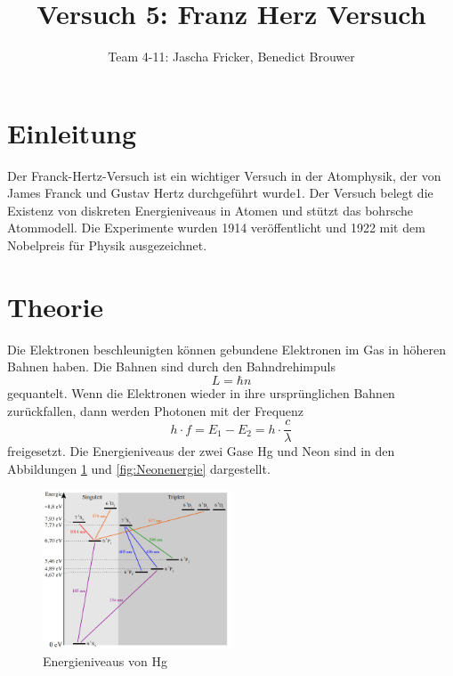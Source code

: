 \documentclass[11pt, a4paper]{article}
\title{Versuch 5: Franz Herz Versuch}
\author{Team 4-11: Jascha Fricker, Benedict Brouwer}
\begin{document}
    \maketitle

    \tableofcontents

    \newpage

    \section{Einleitung}
    Der Franck-Hertz-Versuch ist ein wichtiger Versuch in der Atomphysik, der von James Franck und Gustav Hertz durchgeführt wurde1. Der Versuch belegt die Existenz von diskreten Energieniveaus in Atomen und stützt das bohrsche Atommodell. Die Experimente wurden 1914 veröffentlicht und 1922 mit dem Nobelpreis für Physik ausgezeichnet.

    \section{Theorie}

    Die Elektronen beschleunigten können gebundene Elektronen im Gas in höheren Bahnen haben. Die Bahnen sind durch den Bahndrehimpuls
    \begin{equation}
        L = \hbar n
    \end{equation}
    gequantelt. Wenn die Elektronen wieder in ihre ursprünglichen Bahnen zurückfallen, dann werden Photonen mit der Frequenz
    \begin{equation}
        h \cdot f = E_1 - E_2 = h \cdot \frac{c}{\lambda} \label{eq:energie}
    \end{equation}
    freigesetzt. Die Energieniveaus der zwei Gase Hg und Neon sind in den Abbildungen \ref{fig:Hgenergie} und \ref{fig:Neonenergie} dargestellt.

    \begin{figure}[h]
        \centering
        \includegraphics[width=0.5\textwidth]{Screenshot_20230320_160508.png}
        \caption{Energieniveaus von Hg \cite{FHV}}
        \label{fig:Hgenergie}
    \end{figure}
\end{document}
